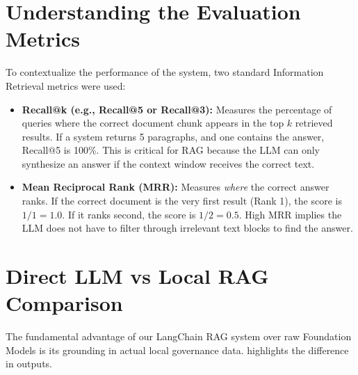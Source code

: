 \section{Understanding the Evaluation Metrics}
To contextualize the performance of the system, two standard Information Retrieval metrics were used:
\begin{itemize}
    \item \textbf{Recall@k (e.g., Recall@5 or Recall@3):} Measures the percentage of queries where the correct document chunk appears in the top $k$ retrieved results. If a system returns 5 paragraphs, and one contains the answer, Recall@5 is 100\%. This is critical for RAG because the LLM can only synthesize an answer if the context window receives the correct text.
    \item \textbf{Mean Reciprocal Rank (MRR):} Measures \textit{where} the correct answer ranks. If the correct document is the very first result (Rank 1), the score is $1/1 = 1.0$. If it ranks second, the score is $1/2 = 0.5$. High MRR implies the LLM does not have to filter through irrelevant text blocks to find the answer.
\end{itemize}

\section{Direct LLM vs Local RAG Comparison}
The fundamental advantage of our LangChain RAG system over raw Foundation Models is its grounding in actual local governance data.  highlights the difference in outputs.

